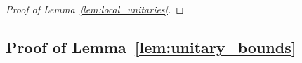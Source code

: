 \begin{proof}[Proof of Lemma~\ref{lem:local_unitaries}]
%
%
%

\end{proof}


\subsection{Proof of Lemma~\ref{lem:unitary_bounds}}\label{sec:local-unitaries}

